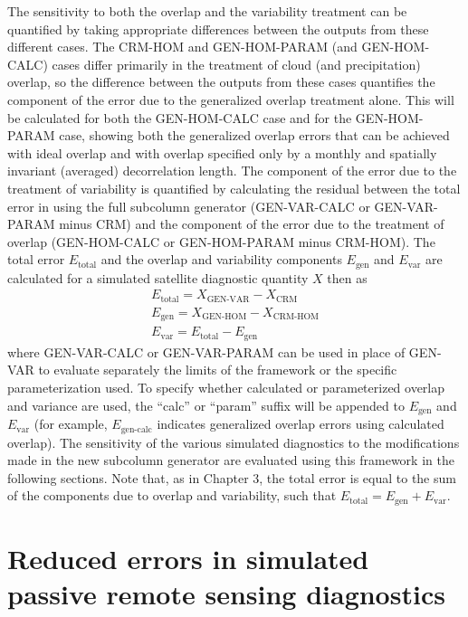 The sensitivity to both the overlap and the variability treatment can be
quantified by taking appropriate differences between the outputs from
these different cases. The CRM-HOM and GEN-HOM-PARAM (and GEN-HOM-CALC)
cases differ primarily in the treatment of cloud (and precipitation)
overlap, so the difference between the outputs from these cases
quantifies the component of the error due to the generalized overlap
treatment alone. This will be calculated for both the GEN-HOM-CALC case
and for the GEN-HOM-PARAM case, showing both the generalized overlap
errors that can be achieved with ideal overlap and with overlap
specified only by a monthly and spatially invariant (averaged)
decorrelation length. The component of the error due to the treatment of
variability is quantified by calculating the residual between the total
error in using the full subcolumn generator (GEN-VAR-CALC or
GEN-VAR-PARAM minus CRM) and the component of the error due to the
treatment of overlap (GEN-HOM-CALC or GEN-HOM-PARAM minus CRM-HOM). The
total error \(E_\textrm{total}\) and the overlap and variability
components \(E_\textrm{gen}\) and \(E_\textrm{var}\) are calculated for
a simulated satellite diagnostic quantity \(X\) then as
\[\begin{gathered} 
    E_\textrm{total} = X_\textrm{GEN-VAR} - X_\textrm{CRM} \\ 
    E_\textrm{gen} = X_\textrm{GEN-HOM} - X_\textrm{CRM-HOM} \\ 
    E_\textrm{var} = E_\textrm{total} - E_\textrm{gen}
\end{gathered}\] where GEN-VAR-CALC or GEN-VAR-PARAM can be used in
place of GEN-VAR to evaluate separately the limits of the framework or
the specific parameterization used. To specify whether calculated or
parameterized overlap and variance are used, the ``calc'' or ``param''
suffix will be appended to \(E_\textrm{gen}\) and \(E_\textrm{var}\)
(for example, \(E_\textrm{gen-calc}\) indicates generalized overlap
errors using calculated overlap). The sensitivity of the various
simulated diagnostics to the modifications made in the new subcolumn
generator are evaluated using this framework in the following sections.
Note that, as in Chapter 3, the total error is equal to the sum of the
components due to overlap and variability, such that
\(E_\textrm{total} = E_\textrm{gen} + E_\textrm{var}\).

\section{Reduced errors in simulated passive remote sensing
diagnostics}\label{sec:subgrid2Passive}

